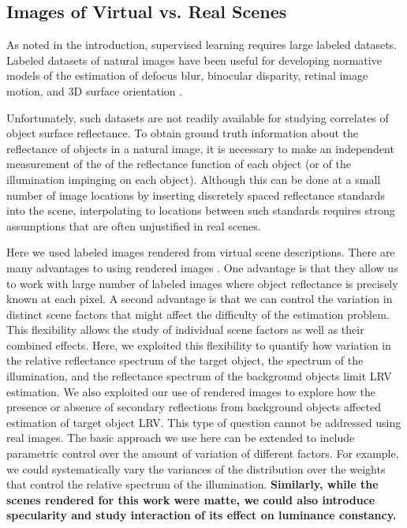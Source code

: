 \documentclass{jov}
\providecommand{\DIFaddtex}[1]{{\bf #1}} %
\providecommand{\DIFaddbegin}{} %
\providecommand{\DIFaddend}{} %
\providecommand{\DIFadd}[1]{\texorpdfstring{\DIFaddtex{#1}}{#1}} %
\newcommand{\DIFaddincludegraphics}[2][]{{\color{blue}\fbox{\DIFOincludegraphics[#1]{#2}}}} %
\DeclareRobustCommand{\DIFaddbegin}{\DIFOaddbegin \let\includegraphics\DIFaddincludegraphics} %
\DeclareRobustCommand{\DIFaddend}{\DIFOaddend \let\includegraphics\DIFOincludegraphics} %
\begin{document}
\subsection{Images of Virtual vs. Real Scenes}
As noted in the introduction, supervised learning requires large labeled datasets. Labeled datasets of natural images have been useful for developing normative models of the estimation of defocus blur, binocular disparity, retinal image motion, and 3D surface orientation \cite{burge2011optimal, burge2012optimal, burge2014optimal, burge2015optimal, sebastian2015defocus, kim2018lawful, burge2010natural, girshick2011cardinal, burge2016estimating, goncalves2017not}. 

Unfortunately, such datasets are not readily available for studying correlates of object surface reflectance.
To obtain ground truth information about the reflectance of objects in a natural image, it is necessary to make 
an independent measurement of the of the reflectance function of each object (or of the illumination impinging on each object).
Although this can be done at a small number of image locations by inserting discretely spaced reflectance standards into the scene, 
interpolating to locations between such standards requires strong assumptions that are often unjustified in real scenes.

Here we used labeled images rendered from virtual scene descriptions. 
There are many advantages to using rendered images \cite{Butler:ECCV:2012}.
One advantage is that they allow us to work with large number of labeled images where object reflectance is precisely known at each pixel.
A second advantage is that we can control the variation in distinct scene factors that might affect the difficulty of the estimation problem.
This flexibility allows the study of individual scene factors as well as their combined effects.
Here, we exploited this flexibility to quantify how variation in the relative reflectance spectrum of the target object, the spectrum of the illumination, and the reflectance spectrum of the background objects limit LRV estimation.
We also exploited our use of rendered images to explore how the presence or absence of secondary reflections from background objects affected estimation
of target object LRV.
This type of question cannot be addressed using real images.
The basic approach we use here can be extended to include parametric control over the amount of variation of different factors.
For example, we could systematically vary the variances of the distribution over the weights that control the relative spectrum
of the illumination.
\DIFaddbegin \DIFadd{Similarly, while the scenes rendered for this work were matte, 
we could also introduce specularity and study interaction of its effect on luminance constancy.
}\DIFaddend 
\end{document}
